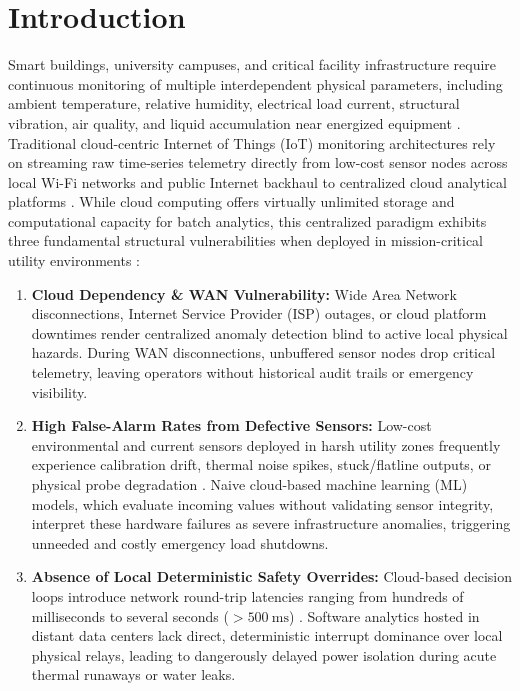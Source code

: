 \documentclass[conference]{IEEEtran}
\begin{document}
\section{Introduction}
Smart buildings, university campuses, and critical facility infrastructure require continuous monitoring of multiple interdependent physical parameters, including ambient temperature, relative humidity, electrical load current, structural vibration, air quality, and liquid accumulation near energized equipment \cite{b7, b10}. Traditional cloud-centric Internet of Things (IoT) monitoring architectures rely on streaming raw time-series telemetry directly from low-cost sensor nodes across local Wi-Fi networks and public Internet backhaul to centralized cloud analytical platforms \cite{b8}. While cloud computing offers virtually unlimited storage and computational capacity for batch analytics, this centralized paradigm exhibits three fundamental structural vulnerabilities when deployed in mission-critical utility environments \cite{b3, b11}:

\begin{enumerate}
    \item \textbf{Cloud Dependency \& WAN Vulnerability:} Wide Area Network disconnections, Internet Service Provider (ISP) outages, or cloud platform downtimes render centralized anomaly detection blind to active local physical hazards. During WAN disconnections, unbuffered sensor nodes drop critical telemetry, leaving operators without historical audit trails or emergency visibility.
    \item \textbf{High False-Alarm Rates from Defective Sensors:} Low-cost environmental and current sensors deployed in harsh utility zones frequently experience calibration drift, thermal noise spikes, stuck/flatline outputs, or physical probe degradation \cite{b16, b17}. Naive cloud-based machine learning (ML) models, which evaluate incoming values without validating sensor integrity, interpret these hardware failures as severe infrastructure anomalies, triggering unneeded and costly emergency load shutdowns.
    \item \textbf{Absence of Local Deterministic Safety Overrides:} Cloud-based decision loops introduce network round-trip latencies ranging from hundreds of milliseconds to several seconds ($> 500~\text{ms}$) \cite{b8}. Software analytics hosted in distant data centers lack direct, deterministic interrupt dominance over local physical relays, leading to dangerously delayed power isolation during acute thermal runaways or water leaks.
\end{enumerate}
\end{document}
